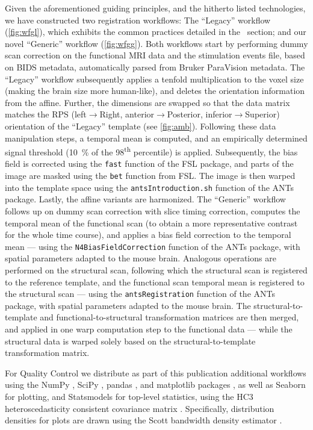 Given the aforementioned guiding principles, and the hitherto listed technologies, we have constructed two registration workflows: The “Legacy” workflow (\cref{fig:wfgl}), which exhibits the common practices detailed in the ~section; and our novel “Generic” workflow (\cref{fig:wfgg}).
Both workflows start by performing dummy scan correction on the functional MRI data and the stimulation events file, based on BIDS metadata, automatically parsed from Bruker ParaVision metadata.
The “Legacy” workflow subsequently applies a tenfold multiplication to the voxel size (making the brain size more human-like), and deletes the orientation information from the affine.
Further, the dimensions are swapped so that the data matrix matches the RPS (left$\rightarrow$Right, anterior$\rightarrow$Posterior, inferior$\rightarrow$Superior) orientation of the “Legacy” template (see \cref{fig:amb}).
Following these data manipulation steps, a temporal mean is computed, and an empirically determined signal threshold (\SI{10}{\percent} of the 98\textsuperscript{th} percentile) is applied.
Subsequently, the bias field is corrected using the \textcolor{mg}{\texttt{fast}} function of the FSL package, and parts of the image are masked using the \textcolor{mg}{\texttt{bet}} function from FSL.
The image is then warped into the template space using the \textcolor{mg}{\texttt{antsIntroduction.sh}} function of the ANTs package.
Lastly, the affine variants are harmonized.
The “Generic” workflow follows up on dummy scan correction with slice timing correction, computes the temporal mean of the functional scan (to obtain a more representative contrast for the whole time course), and applies a bias field correction to the temporal mean --- using the \textcolor{mg}{\texttt{N4BiasFieldCorrection}} function of the ANTs package, with spatial parameters adapted to the mouse brain.
Analogous operations are performed on the structural scan, following which the structural scan is registered to the reference template, and the functional scan temporal mean is registered to the structural scan --- using the \textcolor{mg}{\texttt{antsRegistration}} function of the ANTs package, with spatial parameters adapted to the mouse brain.
The structural-to-template and functional-to-structural transformation matrices are then merged, and applied in one warp computation step to the functional data --- while the structural data is warped solely based on the structural-to-template transformation matrix.

For Quality Control we distribute as part of this publication additional workflows using the NumPy \cite{numpy}, SciPy \cite{scipy}, pandas \cite{pandas}, and matplotlib packages \cite{matplotlib}, as well as Seaborn \cite{seaborn} for plotting, and Statsmodels \cite{statsmodels} for top-level statistics, using the HC3 heteroscedasticity consistent covariance matrix \cite{long2000}.
Specifically, distribution densities for plots are drawn using the Scott bandwidth density estimator \cite{Scott1979}.


